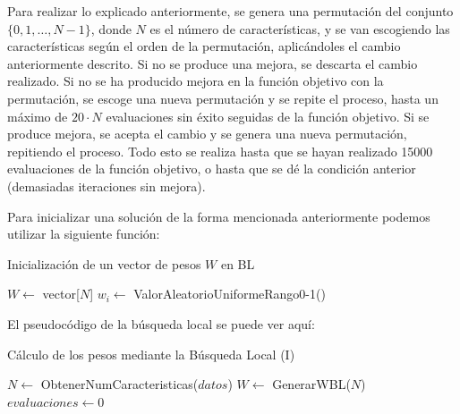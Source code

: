 \documentclass[11pt,a4paper]{article}
\begin{document}
Para realizar lo explicado anteriormente, se genera una permutación del conjunto $\lbrace 0, 1, \dots , N-1 \rbrace$, donde $N$
es el número de características, y se van escogiendo las características según el orden de la permutación, aplicándoles
el cambio anteriormente descrito. Si no se produce una mejora, se descarta el cambio realizado. Si no se ha producido mejora
en la función objetivo con la permutación, se escoge una nueva permutación y se repite el proceso, hasta un máximo de $20
\cdot N$ evaluaciones sin éxito seguidas de la función objetivo. Si se produce mejora, se acepta el cambio y se genera una
nueva permutación, repitiendo el proceso. Todo esto se realiza hasta que se hayan realizado 15000 evaluaciones de la función
objetivo, o hasta que se dé la condición anterior (demasiadas iteraciones sin mejora).

Para inicializar una solución de la forma mencionada anteriormente podemos utilizar la siguiente función:

\begin{algorithm}[H]
\caption{Inicialización de un vector de pesos $W$ en BL}
\begin{algorithmic}[1]
\State$W \gets$ vector[$N$]
	 \State $w_i \gets$ ValorAleatorioUniformeRango0-1()
\EndFor
\State {}
\EndFunction
\end{algorithmic}
\end{algorithm}

El pseudocódigo de la búsqueda local se puede ver aquí:

\begin{algorithm}[H]
\label{alg:local-search}
\caption{Cálculo de los pesos mediante la Búsqueda Local (I)}
\begin{algorithmic}[1]
\State $N \gets $ ObtenerNumCaracteristicas($datos$)
\State $W \gets$ GenerarWBL($N$)
\State $evaluaciones \gets 0$
\end{algorithmic}
\end{algorithm}
\end{document}

